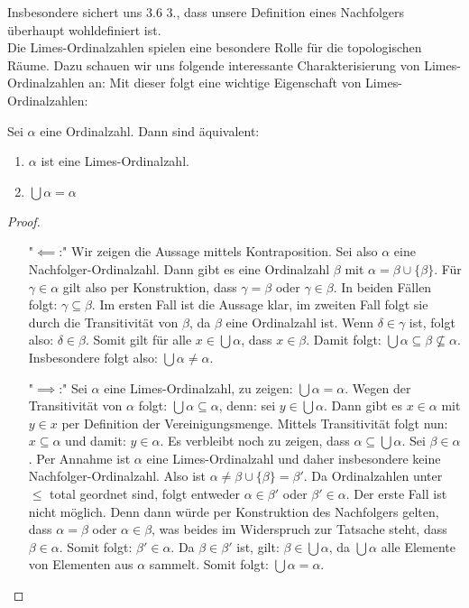 \documentclass[11pt]{scrartcl}
\begin{document}
Insbesondere sichert uns 3.6 3., dass unsere Definition eines Nachfolgers überhaupt wohldefiniert ist.\\
Die Limes-Ordinalzahlen spielen eine besondere Rolle für die topologischen Räume. Dazu schauen wir uns folgende interessante Charakterisierung von Limes-Ordinalzahlen an:
\noindent Mit dieser folgt eine wichtige Eigenschaft von Limes-Ordinalzahlen:
\begin{theorem}
	Sei $\alpha$ eine Ordinalzahl. Dann sind äquivalent:
	\begin{enumerate}
		\item $\alpha$ ist eine Limes-Ordinalzahl.
		\item $\bigcup \alpha = \alpha$
	\end{enumerate}
\end{theorem}
\begin{proof}\hfill
\begin{itemize}
	\item["$\impliedby$:"] Wir zeigen die Aussage mittels Kontraposition. Sei also $\alpha$ eine Nachfolger-Ordinalzahl. Dann gibt es eine Ordinalzahl $\beta$ mit $\alpha = \beta \cup \{\beta\}$. Für $\gamma\in \alpha$ gilt also per Konstruktion, dass $\gamma = \beta$ oder $\gamma \in \beta$. In beiden Fällen folgt: $\gamma \subseteq \beta$. Im ersten Fall ist die Aussage klar, im zweiten Fall folgt sie durch die Transitivität von $\beta$, da $\beta$ eine Ordinalzahl ist. Wenn $\delta \in \gamma$ ist, folgt also: $\delta \in \beta$. Somit gilt für alle $x\in \bigcup \alpha$, dass $x\in \beta$. Damit folgt: $\bigcup \alpha \subseteq \beta \nsubseteq \alpha$. Insbesondere folgt also: $\bigcup \alpha \neq \alpha$.
	\item["$\implies$:"] Sei $\alpha$ eine Limes-Ordinalzahl, zu zeigen: $\bigcup \alpha = \alpha$. Wegen der Transitivität von $\alpha$ folgt: $\bigcup \alpha \subseteq \alpha$, denn: sei $y\in \bigcup \alpha$. Dann gibt es $x\in \alpha$ mit $y\in x$ per Definition der Vereinigungsmenge. Mittels Transitivität folgt nun: $ x \subseteq \alpha$ und damit: $y\in \alpha$. Es verbleibt noch zu zeigen, dass $\alpha \subseteq \bigcup \alpha$. Sei $\beta\in \alpha$. Per Annahme ist $\alpha$ eine Limes-Ordinalzahl und daher insbesondere keine Nachfolger-Ordinalzahl. Also ist $\alpha \neq \beta \cup \{ \beta\}=\beta'$. Da Ordinalzahlen unter $\leq$ total geordnet sind, folgt entweder $\alpha \in \beta'$ oder $\beta' \in \alpha$. Der erste Fall ist nicht möglich. Denn dann würde per Konstruktion des Nachfolgers gelten, dass $\alpha=\beta$ oder $\alpha \in \beta$, was beides im Widerspruch zur Tatsache steht, dass $\beta \in \alpha$. Somit folgt: $\beta' \in \alpha$. Da $\beta\in \beta'$ ist, gilt: $\beta\in \bigcup \alpha$, da $\bigcup\alpha$ alle Elemente von Elementen aus $\alpha$ sammelt. Somit folgt: $\bigcup \alpha = \alpha$.
\end{itemize}
\end{proof}
\end{document}
